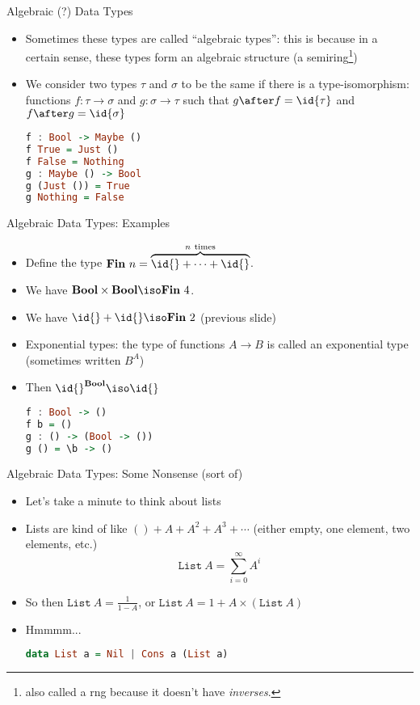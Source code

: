 \documentclass[leqno,presentation,usenames,dvipsnames]{beamer}
\newcommand{\bool}{\textbf{Bool}}
\newcommand{\fin}{\textbf{Fin}}
\begin{document}
\begin{frame}[fragile]{Algebraic (?) Data Types}
    \begin{itemize}
        \item Sometimes these types are called ``algebraic types'': this is because in a certain sense, these types form an algebraic structure (a semiring\footnote{also called a rng because it doesn't have \emph{inverses}.})
        \item We consider two types $\tau$ and $\sigma$ to be the same if there is a type-isomorphism: functions $f : \tau \to \sigma$ and $g : \sigma \to \tau$ such that $g \after f = \id{\tau}$ and $f \after g = \id{\sigma}$
\begin{lstlisting}[language=haskell, basicstyle=\small\ttfamily]
f : Bool -> Maybe ()
f True = Just ()
f False = Nothing
g : Maybe () -> Bool
g (Just ()) = True
g Nothing = False
\end{lstlisting}
    \end{itemize}
\end{frame}

\begin{frame}[fragile]{Algebraic Data Types: Examples}
    \begin{itemize}
        \item Define the type $\fin~n = \overbrace{\id{} + \cdots + \id{}}^{n~\text{times}}$.
        \item We have $\bool \times \bool \iso \fin~4$.
        \item We have $\id{} + \id{} \iso \fin~2$ (previous slide)
        \item Exponential types: the type of functions $A \to B$ is called an exponential type (sometimes written $B^A$)
        \item Then $\id{}^{\bool} \iso \id{}$
\begin{lstlisting}[language=haskell, basicstyle=\small\ttfamily]
f : Bool -> ()
f b = ()
g : () -> (Bool -> ())
g () = \b -> ()
\end{lstlisting}
    \end{itemize}
\end{frame}

\begin{frame}[fragile]{Algebraic Data Types: Some Nonsense (sort of)}
    \begin{itemize}
        \item Let's take a minute to think about lists
        \item Lists are kind of like $() + A + A^2 + A^3 + \cdots$ (either empty, one element, two elements, etc.)
        \[
            \texttt{List}~A = \sum_{i=0}^{\infty} A^i
        \]

    \item So then $\texttt{List}~A = \frac{1}{1 - A}$, or $\texttt{List}~A = 1 + A \times (\texttt{List}~A)$
    \item Hmmmm...
\begin{lstlisting}[language=haskell, basicstyle=\small\ttfamily]
data List a = Nil | Cons a (List a)
\end{lstlisting}
    \end{itemize}
\end{frame}
\end{document}
